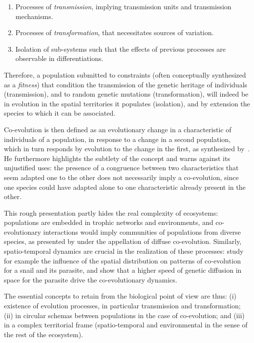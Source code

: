 \documentclass[letterpaper]{article}
\begin{document}
\begin{enumerate}
\item Processes of \emph{transmission}, implying transmission units and transmission mechanisms.
\item Processes of \emph{transformation}, that necessitates sources of variation.
\item Isolation of sub-systems such that the effects of previous processes are observable in differentiations.
\end{enumerate}

Therefore, a population submitted to constraints (often conceptually synthesized as a \emph{fitness}) that condition the transmission of the genetic heritage of individuals (transmission), and to random genetic mutations (transformation), will indeed be in evolution in the spatial territories it populates (isolation), and by extension the species to which it can be associated. 

Co-evolution is then defined as an evolutionary change in a characteristic of individuals of a population, in response to a change in a second population, which in turn responds by evolution to the change in the first, as synthesized by~\cite{janzen1980coevolution}. He furthermore highlights the subtlety of the concept and warns against its unjustified uses: the presence of a congruence between two characteristics that seem adapted one to the other does not necessarily imply a co-evolution, since one species could have adapted alone to one characteristic already present in the other.

This rough presentation partly hides the real complexity of ecosystems: populations are embedded in trophic networks and environments, and co-evolutionary interactions would imply communities of populations from diverse species, as presented by \cite{strauss2005toward} under the appellation of diffuse co-evolution. Similarly, spatio-temporal dynamics are crucial in the realization of these processes: \cite{dybdahl1996geography} study for example the influence of the spatial distribution on patterns of co-evolution for a snail and its parasite, and show that a higher speed of genetic diffusion in space for the parasite drive the co-evolutionary dynamics.


The essential concepts to retain from the biological point of view are thus: (i) existence of evolution processes, in particular transmission and transformation; (ii) in circular schemas between populations in the case of co-evolution; and (iii) in a complex territorial frame (spatio-temporal and environmental in the sense of the rest of the ecosystem).
\end{document}

